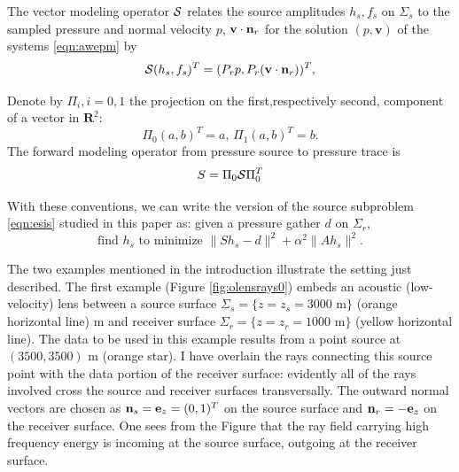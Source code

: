 \documentclass[georeport,12pt]{geophysics}
\newcommand{\bv}{\mathbf{v}}
\newcommand{\bR}{\mathbf{R}}
\begin{document}
The vector modeling operator ${\cal S}$ relates the source amplitudes
$h_s,f_s$ on $\Sigma_s$ to the sampled pressure and normal velocity
$p$, $\bv \cdot {\bf n}_r$ for 
the solution $(p,\bv)$ of the systems \ref{eqn:awepm} by
\begin{equation}
   {\cal S}(h_s,f_s)^T  = (P_rp,P_r(\bv \cdot {\bf n}_r) )^T,
  \label{eqn:fwd}
\end{equation}

Denote by $\Pi_i, i=0,1$ the projection on the first,respectively
second, component of a vector in $\bR^2$:
\begin{equation}
  \label{eqn:pidef}
  \Pi_0 (a,b)^T = a, \, \Pi_1(a,b)^T= b.
\end{equation}
The forward modeling
operator from pressure source to pressure trace is
\begin{equation}
  \label{eqn:sdef}
  S = \Pi_0 {\cal S}\Pi_0^T 
\end{equation}

With these conventions, we can write the version of the source
subproblem \ref{eqn:esis} studied in this paper as: given a pressure
gather $d$ on $\Sigma_r$,
\begin{equation}
  \label{eqn:esisp}
  \mbox{find }h_s\mbox{ to minimize }\|Sh_s- d\|^2 +
  \alpha^2\|Ah_s\|^2.
\end{equation}

The two examples mentioned in the introduction illustrate the setting
just described. The first example (Figure \ref{fig:olensrays0}) embeds
an acoustic (low-velocity) lens between a source surface
$\Sigma_s= \{z = z_s=3000 \mbox{ m}\}$ (orange horizontal line) m and
receiver surface $\Sigma_r= \{z=z_r=1000 \mbox{ m}\}$ (yellow
horizontal line).  The data to be used in this example results from a
point source at $(3500, 3500)$ m (orange star). I have overlain
the rays connecting this source point with the data portion of the
receiver surface: evidently all of the rays involved cross the source
and receiver surfaces transversally. The outward normal vectors are chosen as
${\bf n}_s={\bf e}_z=(0,1)^T$ on the source surface and ${\bf
  n}_r=-{\bf e}_z$ on the receiver surface.
One sees from the Figure that the ray field carrying high frequency
energy is incoming at the source surface,
outgoing at the receiver surface.
\end{document}
